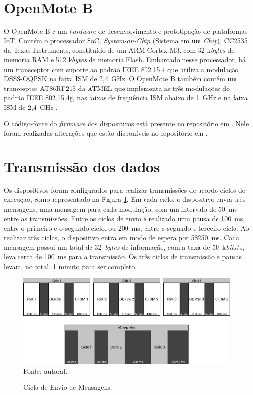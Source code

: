 \section{OpenMote B}
O OpenMote B é um \emph{hardware} de desenvolvimento e prototipação de plataformas IoT. Contém o processador SoC, \emph{System-on-Chip} (Sistema em um \emph{Chip}), CC2535 da Texas Instruments, constituído de um ARM Cortex-M3, com 32 k\emph{bytes} de memoria RAM e 512 k\emph{bytes} de memoria Flash. Embarcado nesse processador, há um transceptor com suporte ao padrão IEEE 802.15.4 que utiliza a modulação DSSS-OQPSK na faixa ISM de 2,4~GHz. O OpenMote B também contém um transceptor AT86RF215 da ATMEL que implementa as três modulações do padrão IEEE 802.15.4g, nas faixas de frequência ISM abaixo de 1~GHz e na faixa ISM de 2,4~GHz \cite{openmoteb-userguide}.

O código-fonte do \emph{firmware} dos dispositivos está presente no repositório em \cite{openmoteb-firmware}. Nele foram realizadas alterações que estão disponíveis no repositório em \cite{openmoteb-gcompi}.

\section{Transmissão dos dados}
Os dispositivos foram configurados para realizar transmissões de acordo ciclos de execução, como representado na Figura \ref{fig:ciclo_envio}. Em cada ciclo, o dispositivo envia três mensagens, uma mensagem para cada modulação, com um intervalo de 50~ms entre as transmissões. Entre os ciclos de envio é realizado uma pausa de 100~ms, entre o primeiro e o segundo ciclo, ou 200~ms, entre o segundo e terceiro ciclo. Ao realizar três ciclos, o dispositivo entra em modo de espera por 58250~ms. Cada mensagem possui um total de 32~\emph{bytes} de informação, com a taxa de 50~k\emph{bits}/s, leva cerca de 100~ms para a transmissão. Os três ciclos de transmissão e pausas levam, no total, 1 minuto para ser completo.

\begin{figure}[h]
  \centering
  \caption{Ciclo de Envio de Mensagens.}
  \includegraphics[width=\textwidth]{./sections/textual/chapters/images/metodo_ciclo_envio.png}\\
  Fonte: autoral.
  \label{fig:ciclo_envio}
\end{figure}

